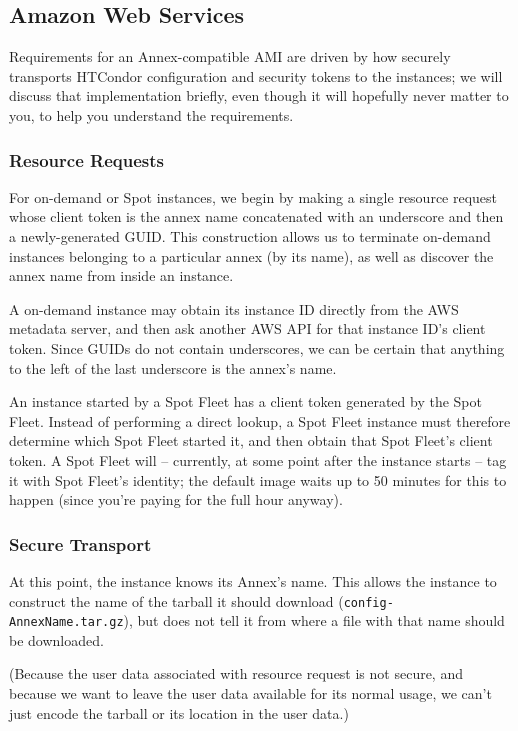 \subsection{\label{sec:clouds-services-aws}Amazon Web Services}

Requirements for an Annex-compatible AMI are driven by how 
securely transports HTCondor configuration and security tokens to the
instances; we will discuss that implementation briefly, even though it will
hopefully never matter to you, to help you understand the requirements.

\subsubsection{Resource Requests}

For on-demand or Spot instances, we begin by making a single resource request
whose client token is the annex name concatenated with an underscore and then
a newly-generated GUID.  This construction allows us to terminate on-demand
instances belonging to a particular annex (by its name), as well as discover
the annex name from inside an instance.

A on-demand instance may obtain its instance ID directly from the AWS
metadata server, and then ask another AWS API for that instance ID's
client token.  Since GUIDs do not contain underscores, we can be certain
that anything to the left of the last underscore is the annex's name.

An instance started by a Spot Fleet has a client token generated by the
Spot Fleet.  Instead of performing a direct lookup, a Spot Fleet instance
must therefore determine which Spot Fleet started it, and then obtain that
Spot Fleet's client token.  A Spot Fleet will -- currently, at some point
after the instance starts -- tag it with Spot Fleet's identity; the default
image waits up to 50 minutes for this to happen (since you're paying for
the full hour anyway).

\subsubsection{Secure Transport}

At this point, the instance knows its Annex's name.  This allows the
instance to construct the name of the tarball it should download
({\tt config-AnnexName.tar.gz}), but does not tell it from where a file
with that name should be downloaded.

(Because the user data associated with resource request is not secure,
and because we want to leave the user data available for its normal
usage, we can't just encode the tarball or its location in the user data.)

